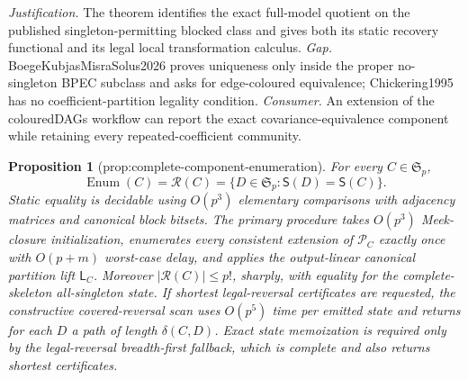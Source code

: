 \documentclass{article}
\newtheorem{proposition}{Proposition}
\begin{document}
\par\smallskip\noindent \textit{Justification.} The theorem identifies the exact full-model quotient on the published singleton-permitting blocked class and gives both its static recovery functional and its legal local transformation calculus. \textit{Gap.} BoegeKubjasMisraSolus2026 proves uniqueness only inside the proper no-singleton BPEC subclass and asks for edge-coloured equivalence; Chickering1995 has no coefficient-partition legality condition. \textit{Consumer.} An extension of the colouredDAGs workflow can report the exact covariance-equivalence component while retaining every repeated-coefficient community.

\begin{proposition}[prop:complete-component-enumeration]\label{prop:complete-component-enumeration}
For every \(C\in\mathfrak S_p\),
\[
 \operatorname{Enum}(C)=\mathcal R(C)
 =\{D\in\mathfrak S_p:\mathsf S(D)=\mathsf S(C)\}.
\]
Static equality is decidable using \(O(p^3)\) elementary comparisons with adjacency matrices and canonical block bitsets. The primary procedure takes \(O(p^3)\) Meek-closure initialization, enumerates every consistent extension of \(\mathcal P_C\) exactly once with \(O(p+m)\) worst-case delay, and applies the output-linear canonical partition lift \(\mathsf L_C\). Moreover \(|\mathcal R(C)|\leq p!\), sharply, with equality for the complete-skeleton all-singleton state. If shortest legal-reversal certificates are requested, the constructive covered-reversal scan uses \(O(p^5)\) time per emitted state and returns for each \(D\) a path of length \(\delta(C,D)\). Exact state memoization is required only by the legal-reversal breadth-first fallback, which is complete and also returns shortest certificates.
\end{proposition}
\end{document}
